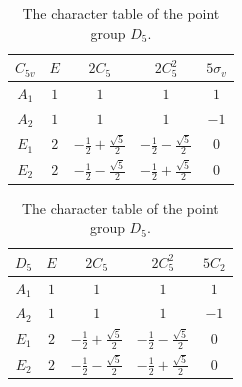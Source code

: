 \documentclass{article}
\begin{document}
    \begin{table}[p]
        \centering
        \renewcommand{\arraystretch}{1.5}
        \begin{minipage}{0.45\textwidth}
            \centering
            \begin{tabular}{c|cccc}
                $C_{5v}$ & $E$ & $2C_5$ & $2C_5^2$ & $5\sigma_v$\\
                \hline
                $A_1$ & $1$ & $1$ & $1$ & $1$\\
                $A_2$ & $1$ & $1$ & $1$ & $-1$\\
                $E_1$ & $2$ & $-\frac12+\frac{\sqrt{5}}{2}$ & $-\frac12-\frac{\sqrt{5}}{2}$ & $0$\\
                $E_2$ & $2$ & $-\frac12-\frac{\sqrt{5}}{2}$ & $-\frac12+\frac{\sqrt{5}}{2}$ & $0$\\
            \end{tabular}
            \caption{The character table of the point group $C_{5v}$. \cite{miessler2014}}
            \label{tab:c5v}
        \end{minipage}
        \hfill
        \begin{minipage}{0.45\textwidth}
            \centering
            \begin{tabular}{c|cccc}
                $D_{5}$ & $E$ & $2C_5$ & $2C_5^2$ & $5C_2$\\
                \hline
                $A_1$ & $1$ & $1$ & $1$ & $1$\\
                $A_2$ & $1$ & $1$ & $1$ & $-1$\\
                $E_1$ & $2$ & $-\frac12+\frac{\sqrt{5}}{2}$ & $-\frac12-\frac{\sqrt{5}}{2}$ & $0$\\
                $E_2$ & $2$ & $-\frac12-\frac{\sqrt{5}}{2}$ & $-\frac12+\frac{\sqrt{5}}{2}$ & $0$\\
            \end{tabular}
            \caption{The character table of the point group $D_5$. \cite{miessler2014}}
            \label{tab:d5}
        \end{minipage}
    \end{table}
\end{document}
